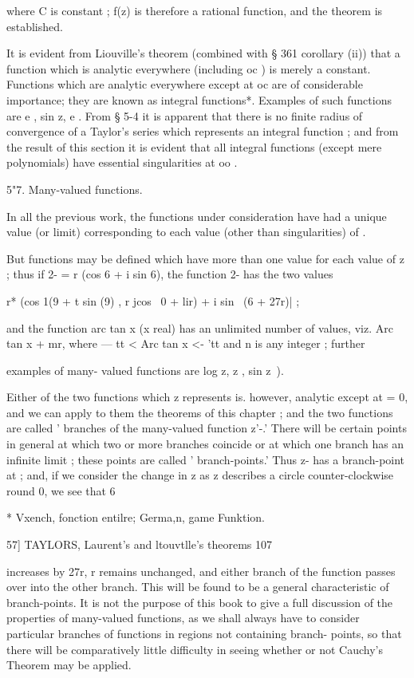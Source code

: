 {{{{where C is constant ; f(z) is therefore a rational function, and the theorem is 
established. 

It is evident from Liouville's theorem (combined with § 361 corollary (ii)) 
that a function which is analytic everywhere (including oc ) is merely a 
constant. Functions which are analytic everywhere except at oc are of 
considerable importance; they are known as integral functions*. Examples 
of such functions are e , sin z, e  . From § 5-4 it is apparent that there is no 
finite radius of convergence of a Taylor's series which represents an integral 
function ; and from the result of this section it is evident that all integral 
functions (except mere polynomials) have essential singularities at oo . 

5"7. Many-valued functions. 

In all the previous work, the functions under consideration have had a 
unique value (or limit) corresponding to each value (other than singularities) 
of  . 

But functions may be defined which have more than one value for each 
value of z ; thus if 2- = r (cos 6 + i sin 6), the function 2- has the two values 

r* (cos 1(9 + t sin   (9) , r  jcos \  0 + lir) + i sin \ (6 + 27r)| ; 

and the function arc tan x (x real) has an unlimited number of values, viz. 
Arc tan x + mr, where —   tt < Arc tan x <- 'tt and n is any integer ; further 

examples of many- valued functions are log z, z   , sin  z~). 

Either of the two functions which z  represents is. however, analytic 
except at   = 0, and we can apply to them the theorems of this chapter ; and 
the two functions are called ' branches of the many-valued function z'-.' 
There will be certain points in general at which two or more branches 
coincide or at which one branch has an infinite limit ; these points are called 
' branch-points.' Thus z- has a branch-point at ; and, if we consider the 
change in z  as z describes a circle counter-clockwise round 0, we see that 6 

* Vxench, fonction entilre; Germa,n, game Funktion. 



57] TAYLORS, Laurent's and ltouvtlle's theorems 107 

increases by 27r, r remains unchanged, and either branch of the function passes 
over into the other branch. This will be found to be a general characteristic 
of branch-points. It is not the purpose of this book to give a full discussion 
of the properties of many-valued functions, as we shall always have to 
consider particular branches of functions in regions not containing branch- 
points, so that there will be comparatively little difficulty in seeing whether 
or not Cauchy's Theorem may be applied. 

}}}}
